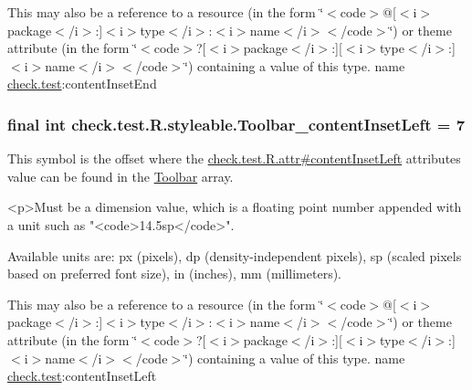 This may also be a reference to a resource (in the form \char`\"{}$<$code$>$@\mbox{[}$<$i$>$package$<$/i$>$\+:\mbox{]}$<$i$>$type$<$/i$>$\+:$<$i$>$name$<$/i$>$$<$/code$>$\char`\"{}) or theme attribute (in the form \char`\"{}$<$code$>$?\mbox{[}$<$i$>$package$<$/i$>$\+:\mbox{]}\mbox{[}$<$i$>$type$<$/i$>$\+:\mbox{]}$<$i$>$name$<$/i$>$$<$/code$>$\char`\"{}) containing a value of this type.  name \hyperlink{namespacecheck_1_1test}{check.\+test}\+:content\+Inset\+End \hypertarget{classcheck_1_1test_1_1_r_1_1styleable_ab328787f8cee01addd35369b3193085f}{}
\subsubsection[{Toolbar\+\_\+content\+Inset\+Left}]{\setlength{\rightskip}{0pt plus 5cm}final int check.\+test.\+R.\+styleable.\+Toolbar\+\_\+content\+Inset\+Left = 7\hspace{0.3cm}{\ttfamily [static]}}\label{classcheck_1_1test_1_1_r_1_1styleable_ab328787f8cee01addd35369b3193085f}
This symbol is the offset where the \hyperlink{classcheck_1_1test_1_1_r_1_1attr_a17f59061d06d3a375e4d728f01e99a9b}{check.\+test.\+R.\+attr\#content\+Inset\+Left} attribute\textquotesingle{}s value can be found in the \hyperlink{classcheck_1_1test_1_1_r_1_1styleable_a1a7fa90223693abef77e7484cca2df54}{Toolbar} array.

\begin{DoxyVerb}      <p>Must be a dimension value, which is a floating point number appended with a unit such as "<code>14.5sp</code>".
\end{DoxyVerb}
 Available units are\+: px (pixels), dp (density-\/independent pixels), sp (scaled pixels based on preferred font size), in (inches), mm (millimeters). 

This may also be a reference to a resource (in the form \char`\"{}$<$code$>$@\mbox{[}$<$i$>$package$<$/i$>$\+:\mbox{]}$<$i$>$type$<$/i$>$\+:$<$i$>$name$<$/i$>$$<$/code$>$\char`\"{}) or theme attribute (in the form \char`\"{}$<$code$>$?\mbox{[}$<$i$>$package$<$/i$>$\+:\mbox{]}\mbox{[}$<$i$>$type$<$/i$>$\+:\mbox{]}$<$i$>$name$<$/i$>$$<$/code$>$\char`\"{}) containing a value of this type.  name \hyperlink{namespacecheck_1_1test}{check.\+test}\+:content\+Inset\+Left \hypertarget{classcheck_1_1test_1_1_r_1_1styleable_a03f33bda55e3dc7f0e54ed0c302c497e}{}
